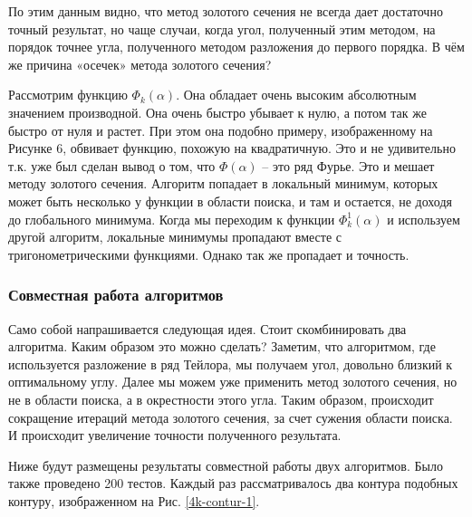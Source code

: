\documentclass[a4paper,12pt, titlepage]{article}
\begin{document}
По этим данным видно, что метод золотого сечения не всегда дает достаточно точный результат, но чаще случаи, когда угол, 
полученный этим методом, на порядок точнее угла, полученного методом разложения до первого порядка. В чём же причина «осечек» 
метода золотого сечения? 

Рассмотрим функцию $\Phi_{k}(\alpha)$. Она обладает очень высоким абсолютным значением производной.  
Она очень быстро убывает к нулю, а потом 
так же быстро от нуля и растет.  При этом она подобно примеру, изображенному на Рисунке 6, обвивает функцию, похожую на 
квадратичную.  Это и не удивительно т.к. уже был сделан вывод о том, что $\Phi(\alpha)$ -- это ряд Фурье. Это и мешает методу 
золотого сечения. 
Алгоритм попадает в локальный минимум, которых может быть несколько у функции в области поиска, и там и остается, не доходя до 
глобального минимума.  Когда мы переходим к функции $\Phi_{k}^{1}(\alpha)$ и используем другой алгоритм, локальные минимумы 
пропадают вместе с 
тригонометрическими функциями. Однако так же пропадает и точность.
\subsubsection{Совместная работа алгоритмов}
Само собой напрашивается следующая идея. Стоит скомбинировать два алгоритма. Каким образом это можно сделать? Заметим, что 
алгоритмом, где используется разложение в ряд Тейлора, мы   получаем угол, довольно близкий к оптимальному углу. Далее мы можем 
уже применить метод золотого сечения, но не в области поиска, а в окрестности этого угла. Таким образом, происходит сокращение 
итераций метода золотого сечения, за счет сужения области поиска. И происходит увеличение точности полученного результата.

Ниже  будут размещены  результаты совместной работы  двух алгоритмов. Было также  проведено 200 тестов. Каждый раз 
рассматривалось два контура подобных контуру, изображенном на Рис. \ref{4k-contur-1}.
\end{document}
